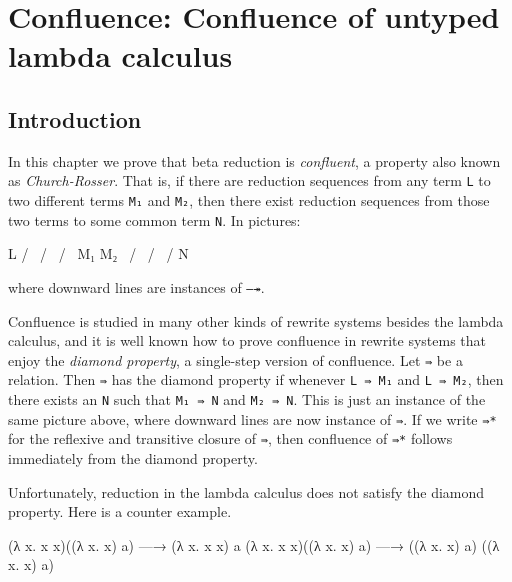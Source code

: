 \hypertarget{Confluence}{%
\chapter{Confluence: Confluence of untyped lambda
calculus}\label{Confluence}}

\begin{fence}
\begin{code}%
\>[0]\AgdaSpace{}%
\AgdaSpace{}%
\<%
\end{code}
\end{fence}

\hypertarget{introduction}{%
\section{Introduction}\label{introduction}}

In this chapter we prove that beta reduction is \emph{confluent}, a
property also known as \emph{Church-Rosser}. That is, if there are
reduction sequences from any term \texttt{L} to two different terms
\texttt{M₁} and \texttt{M₂}, then there exist reduction sequences from
those two terms to some common term \texttt{N}. In pictures:

\begin{myDisplay}
    L
   / \
  /   \
 /     \
M₁      M₂
 \     /
  \   /
   \ /
    N
\end{myDisplay}

where downward lines are instances of \texttt{—↠}.

Confluence is studied in many other kinds of rewrite systems besides the
lambda calculus, and it is well known how to prove confluence in rewrite
systems that enjoy the \emph{diamond property}, a single-step version of
confluence. Let \texttt{⇛} be a relation. Then \texttt{⇛} has the
diamond property if whenever \texttt{L\ ⇛\ M₁} and \texttt{L\ ⇛\ M₂},
then there exists an \texttt{N} such that \texttt{M₁\ ⇛\ N} and
\texttt{M₂\ ⇛\ N}. This is just an instance of the same picture above,
where downward lines are now instance of \texttt{⇛}. If we write
\texttt{⇛*} for the reflexive and transitive closure of \texttt{⇛}, then
confluence of \texttt{⇛*} follows immediately from the diamond property.

Unfortunately, reduction in the lambda calculus does not satisfy the
diamond property. Here is a counter example.

\begin{myDisplay}
(λ x. x x)((λ x. x) a) —→ (λ x. x x) a
(λ x. x x)((λ x. x) a) —→ ((λ x. x) a) ((λ x. x) a)
\end{myDisplay}

